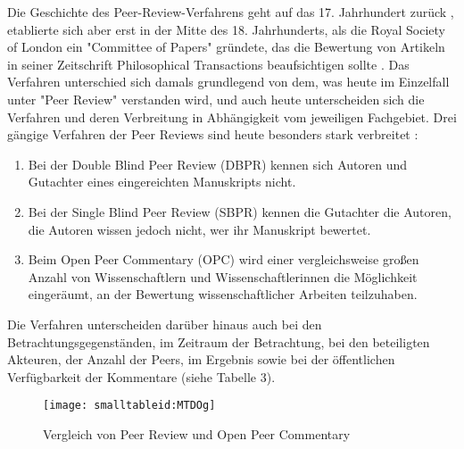 Die Geschichte des Peer-Review-Verfahrens geht auf das 17. Jahrhundert zurück \cite{Kronick_1978}, etablierte sich aber erst in der Mitte des 18. Jahrhunderts, als die Royal Society of London ein "Committee of Papers" gründete, das die Bewertung von Artikeln in seiner Zeitschrift Philosophical Transactions beaufsichtigen sollte \cite{Kronick_1990}. Das Verfahren unterschied sich damals grundlegend von dem, was heute im Einzelfall unter "Peer Review" verstanden wird, und auch heute unterscheiden sich die Verfahren und deren Verbreitung in Abhängigkeit vom jeweiligen Fachgebiet. Drei gängige Verfahren der Peer Reviews sind heute besonders stark verbreitet \cite{Mueller_2009}:
\begin{enumerate}
\item Bei der Double Blind Peer Review (DBPR) kennen sich Autoren und Gutachter eines eingereichten Manuskripts nicht.
\item Bei der Single Blind Peer Review (SBPR) kennen die Gutachter die Autoren, die Autoren wissen jedoch nicht, wer ihr Manuskript bewertet.
\item Beim Open Peer Commentary (OPC) wird einer vergleichsweise großen Anzahl von Wissenschaftlern und Wissenschaftlerinnen die Möglichkeit eingeräumt, an der Bewertung wissenschaftlicher Arbeiten teilzuhaben.
\end{enumerate}
Die Verfahren unterscheiden darüber hinaus auch bei den Betrachtungsgegenständen, im Zeitraum der Betrachtung, bei den beteiligten Akteuren, der Anzahl der Peers, im Ergebnis sowie bei der öffentlichen Verfügbarkeit der Kommentare (siehe Tabelle 3).
\begin{figure}[h!]
\texttt{[image: smalltableid:MTDOg]}
\caption{Vergleich von Peer Review und Open Peer Commentary}
\end{figure}

